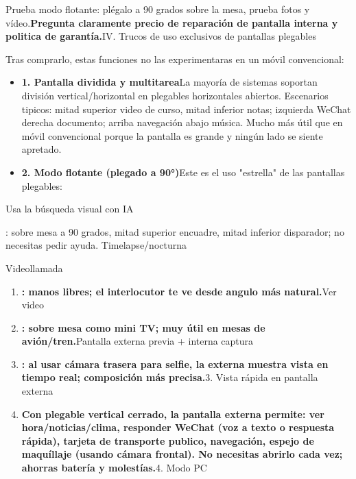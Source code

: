 


Prueba modo flotante: plégalo a 90 grados sobre la mesa, prueba fotos y vídeo.\textbf{Pregunta claramente precio de reparación de pantalla interna y politica de garantía.}IV. Trucos de uso exclusivos de pantallas plegables

Tras comprarlo, estas funciones no las experimentaras en un móvil convencional:

\begin{itemize}
  \item \textbf{1. Pantalla dividida y multitarea}La mayoría de sistemas soportan división vertical/horizontal en plegables horizontales abiertos. Escenarios tipicos: mitad superior video de curso, mitad inferior notas; izquierda WeChat derecha documento; arriba navegación abajo música. Mucho más útil que en móvil convencional porque la pantalla es grande y ningún lado se siente apretado.
  \item \textbf{2. Modo flotante (plegado a 90°)}Este es el uso "estrella" de las pantallas plegables:
\end{itemize}

Usa la búsqueda visual con IA

\begin{tcbinfo}{: sobre mesa a 90 grados, mitad superior encuadre, mitad inferior disparador; no necesitas pedir ayuda.}
Timelapse/nocturna

\end{tcbinfo}


Videollamada

\begin{enumerate}
  \item \textbf{: manos libres; el interlocutor te ve desde angulo más natural.}Ver video
  \item \textbf{: sobre mesa como mini TV; muy útil en mesas de avión/tren.}Pantalla externa previa + interna captura
  \item \textbf{: al usar cámara trasera para selfie, la externa muestra vista en tiempo real; composición más precisa.}3. Vista rápida en pantalla externa
  \item \textbf{Con plegable vertical cerrado, la pantalla externa permite: ver hora/noticias/clima, responder WeChat (voz a texto o respuesta rápida), tarjeta de transporte publico, navegación, espejo de maquíllaje (usando cámara frontal). No necesitas abrirlo cada vez; ahorras batería y molestías.}4. Modo PC
\end{enumerate}

